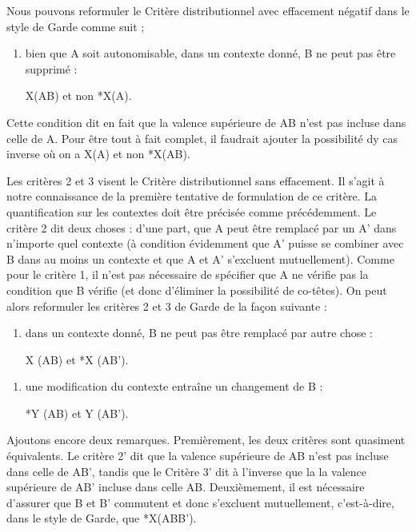{   Nous pouvons reformuler le Critère distributionnel avec effacement négatif dans le style de Garde comme suit ;
    
    \begin{enumerate}[label=1'.] \item  bien que A soit autonomisable, dans un contexte donné, B ne peut pas être supprimé :
    
    \begin{center}X(AB) et non *X(A).\end{center}
    \end{enumerate}
    Cette condition dit en fait que la valence supérieure de AB n'est pas incluse dans celle de A.
    Pour être tout à fait complet, il faudrait ajouter la possibilité dy cas inverse où on a X(A) et non *X(AB).
    
    Les critères 2 et 3 visent le Critère distributionnel sans effacement. Il s'agit à notre connaissance de la première tentative de formulation de ce critère.  La quantification sur les contextes doit être précisée comme précédemment. Le critère 2 dit deux choses : d’une part, que A peut être remplacé par un A’ dans n’importe quel contexte (à condition évidemment que A’ puisse se combiner avec B dans au moins un contexte et que A et A' s'excluent mutuellement).
   Comme pour le critère 1, il n'est pas nécessaire de spécifier que A ne vérifie pas la condition que B vérifie (et donc d'éliminer la possibilité de co-têtes). On peut alors reformuler les critères 2 et 3 de Garde de la façon suivante :
    
    \begin{enumerate}[label=2'.] \item dans un contexte donné, B ne peut pas être remplacé par autre chose :
     \begin{center}X (AB) et *X (AB’).\end{center}\end{enumerate}
    
    \begin{enumerate}[label=3'.] \item une modification du contexte entraîne un changement de B :
     \begin{center}*Y (AB) et Y (AB’).\end{center}\end{enumerate}
    
   
   Ajoutons encore deux remarques. Premièrement, les deux critères sont quasiment équivalents. Le critère 2' dit que la valence supérieure de AB n'est pas incluse dans celle de AB', tandis que le Critère 3' dit à l'inverse que la la valence supérieure de AB' incluse dans celle AB. Deuxièmement, il est nécessaire d'assurer que B et B' commutent et donc s'excluent mutuellement, c'est-à-dire, dans le style de Garde, que *X(ABB').

}
